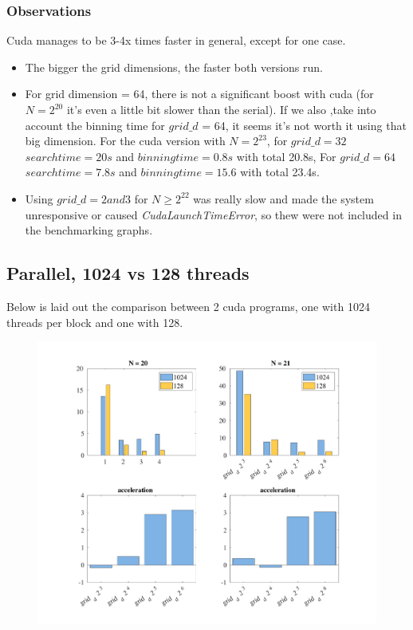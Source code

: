 \documentclass[10pt,a4paper]{article}
\begin{document}
\subsubsection*{Observations}
Cuda manages to be 3-4x times faster in general, except for one case.
\begin{itemize}
\item The bigger the grid dimensions, the faster both versions run.
\item For grid dimension = 64, there is not a significant boost with cuda (for $N = 2^{20}$ it's even a little bit slower than the serial). If we also ,take into account the binning time for $grid\_d$  = 64, it seems it's not worth it using that big dimension. For the cuda version with $N=2^{23}$, for $grid\_d=32$ $search time = 20s$ and $binning time = 0.8s$ with total 20.8s, For $grid\_d = 64$ $search time = 7.8s$ and $binning time = 15.6$ with total 23.4s.
\item Using $grid\_d = 2 and 3$ for $N \geq 2^22$ was really slow and made the system unresponsive or caused \textit{CudaLaunchTimeError}, so thew were not included in the benchmarking graphs.
\end{itemize}

\subsection*{Parallel, 1024 vs 128 threads}
Below is laid out the comparison between 2 cuda programs, one with 1024 threads per block and one with 128.

\begin{figure}[H]

\centering\includegraphics[scale=0.5]{threads2021}
\end{figure}
\end{document}
